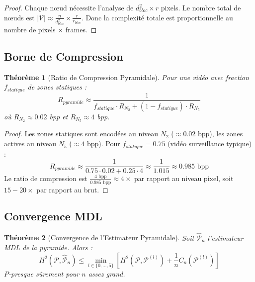 \documentclass[12pt,a4paper]{article}
\newtheorem{theorem}{Théorème}[section]
\theoremstyle{definition}
\begin{document}
	\begin{proof}
		Chaque nœud nécessite l'analyse de $d_{bloc}^2 \times r$ pixels. Le nombre total de nœuds est $|\mathcal{V}| \approx \frac{n}{d_{bloc}^2} \times \frac{r}{r_{bloc}}$. Donc la complexité totale est proportionnelle au nombre de pixels $\times$ frames.
	\end{proof}
	
	\subsection{Borne de Compression}
	
	\begin{theorem}[Ratio de Compression Pyramidale]
		\label{thm:ratio_compression}
		Pour une vidéo avec fraction $f_{statique}$ de zones statiques :
		\begin{equation}
			R_{pyramide} \approx \frac{1}{f_{statique} \cdot R_{N_2} + (1 - f_{statique}) \cdot R_{N_5}}
		\end{equation}
		où $R_{N_2} \approx 0.02$ bpp et $R_{N_5} \approx 4$ bpp.
	\end{theorem}
	
	\begin{proof}
		Les zones statiques sont encodées au niveau $N_2$ ($\approx 0.02$ bpp), les zones actives au niveau $N_5$ ($\approx 4$ bpp). Pour $f_{statique} = 0.75$ (vidéo surveillance typique) :
		\begin{equation}
			R_{pyramide} \approx \frac{1}{0.75 \cdot 0.02 + 0.25 \cdot 4} \approx \frac{1}{1.015} \approx 0.985 \text{ bpp}
		\end{equation}
		Le ratio de compression est $\frac{4 \text{ bpp}}{0.985 \text{ bpp}} \approx 4 \times$ par rapport au niveau pixel, soit $15-20 \times$ par rapport au brut.
	\end{proof}
	
	\subsection{Convergence MDL}
	
	\begin{theorem}[Convergence de l'Estimateur Pyramidale]
		\label{thm:convergence_pyramide}
		Soit $\hat{\mathcal{P}}_n$ l'estimateur MDL de la pyramide. Alors :
		\begin{equation}
			H^2(\mathcal{P}, \hat{\mathcal{P}}_n) \leq \min_{l \in \{0,\dots,5\}} \left[ H^2(\mathcal{P}, \mathcal{P}^{(l)}) + \frac{1}{n} C_n(\mathcal{P}^{(l)}) \right]
		\end{equation}
		$P$-presque sûrement pour $n$ assez grand.
	\end{theorem}
	
\end{document}
